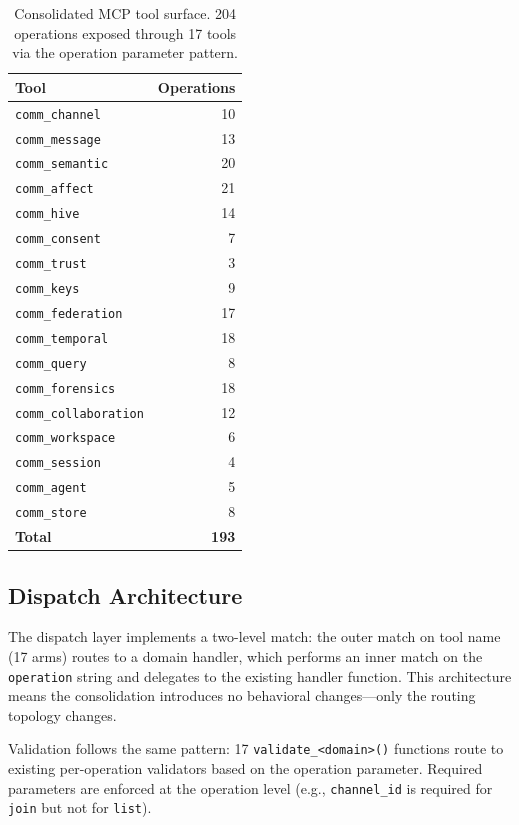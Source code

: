 \documentclass[10pt, twocolumn]{article}
\begin{document}
\begin{table}[t]
\caption{Consolidated MCP tool surface. 204 operations exposed through 17 tools via the operation parameter pattern.}
\label{tab:tools}
\centering
\scriptsize
\begin{tabular}{@{}lr@{}}
\toprule
\textbf{Tool} & \textbf{Operations} \\
\midrule
\texttt{comm\_channel} & 10 \\
\texttt{comm\_message} & 13 \\
\texttt{comm\_semantic} & 20 \\
\texttt{comm\_affect} & 21 \\
\texttt{comm\_hive} & 14 \\
\texttt{comm\_consent} & 7 \\
\texttt{comm\_trust} & 3 \\
\texttt{comm\_keys} & 9 \\
\texttt{comm\_federation} & 17 \\
\texttt{comm\_temporal} & 18 \\
\texttt{comm\_query} & 8 \\
\texttt{comm\_forensics} & 18 \\
\texttt{comm\_collaboration} & 12 \\
\texttt{comm\_workspace} & 6 \\
\texttt{comm\_session} & 4 \\
\texttt{comm\_agent} & 5 \\
\texttt{comm\_store} & 8 \\
\midrule
\textbf{Total} & \textbf{193} \\
\bottomrule
\end{tabular}
\end{table}


\subsection{Dispatch Architecture}

The dispatch layer implements a two-level match: the outer match on tool name (17 arms) routes to a domain handler, which performs an inner match on the \texttt{operation} string and delegates to the existing handler function. This architecture means the consolidation introduces no behavioral changes---only the routing topology changes.

Validation follows the same pattern: 17 \texttt{validate\_<domain>()} functions route to existing per-operation validators based on the operation parameter. Required parameters are enforced at the operation level (e.g., \texttt{channel\_id} is required for \texttt{join} but not for \texttt{list}).
\end{document}
